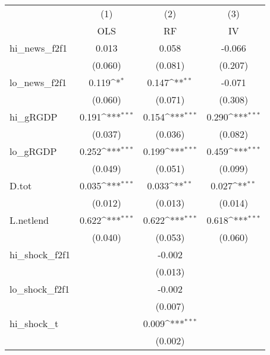 {
\def\sym#1{\ifmmode^{#1}\else\(^{#1}\)\fi}
\begin{tabular}{l*{3}{c}}
\toprule
            &\multicolumn{1}{c}{(1)}&\multicolumn{1}{c}{(2)}&\multicolumn{1}{c}{(3)}\\
            &\multicolumn{1}{c}{OLS}&\multicolumn{1}{c}{RF}&\multicolumn{1}{c}{IV}\\
\midrule
hi\_news\_f2f1&       0.013         &       0.058         &      -0.066         \\
            &     (0.060)         &     (0.081)         &     (0.207)         \\
\addlinespace
lo\_news\_f2f1&       0.119\sym{*}  &       0.147\sym{**} &      -0.071         \\
            &     (0.060)         &     (0.071)         &     (0.308)         \\
\addlinespace
hi\_gRGDP    &       0.191\sym{***}&       0.154\sym{***}&       0.290\sym{***}\\
            &     (0.037)         &     (0.036)         &     (0.082)         \\
\addlinespace
lo\_gRGDP    &       0.252\sym{***}&       0.199\sym{***}&       0.459\sym{***}\\
            &     (0.049)         &     (0.051)         &     (0.099)         \\
\addlinespace
D.tot       &       0.035\sym{***}&       0.033\sym{**} &       0.027\sym{**} \\
            &     (0.012)         &     (0.013)         &     (0.014)         \\
\addlinespace
L.netlend   &       0.622\sym{***}&       0.622\sym{***}&       0.618\sym{***}\\
            &     (0.040)         &     (0.053)         &     (0.060)         \\
\addlinespace
hi\_shock\_f2f1&                     &      -0.002         &                     \\
            &                     &     (0.013)         &                     \\
\addlinespace
lo\_shock\_f2f1&                     &      -0.002         &                     \\
            &                     &     (0.007)         &                     \\
\addlinespace
hi\_shock\_t  &                     &       0.009\sym{***}&                     \\
            &                     &     (0.002)         &                     \\

\end{tabular}}
